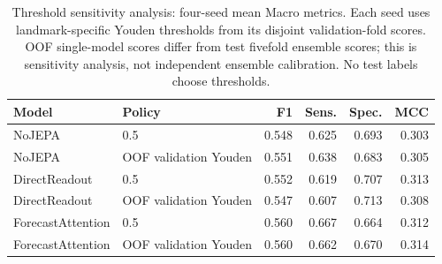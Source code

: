 \begin{table}[t]
\centering
\small
\caption{Threshold sensitivity analysis: four-seed mean Macro metrics. Each seed uses landmark-specific Youden thresholds from its disjoint validation-fold scores. OOF single-model scores differ from test fivefold ensemble scores; this is sensitivity analysis, not independent ensemble calibration. No test labels choose thresholds.}
\label{tab:extended_threshold}
\begin{tabular}{llrrrr}
\toprule
Model & Policy & F1 & Sens. & Spec. & MCC \\
\midrule
NoJEPA & 0.5 & 0.548 & 0.625 & 0.693 & 0.303 \\
NoJEPA & OOF validation Youden & 0.551 & 0.638 & 0.683 & 0.305 \\
\midrule
DirectReadout & 0.5 & 0.552 & 0.619 & 0.707 & 0.313 \\
DirectReadout & OOF validation Youden & 0.547 & 0.607 & 0.713 & 0.308 \\
\midrule
ForecastAttention & 0.5 & 0.560 & 0.667 & 0.664 & 0.312 \\
ForecastAttention & OOF validation Youden & 0.560 & 0.662 & 0.670 & 0.314 \\
\bottomrule
\end{tabular}
\end{table}
